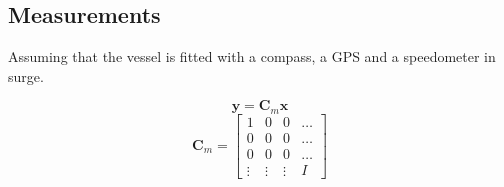 \documentclass[12pt,a4]{article}
\begin{document}
\subsection{Measurements}

Assuming that the vessel is fitted with a compass, a GPS and a speedometer in surge.

\begin{equation}
	\bm{y} = 		\bm{C}_m	\bm{x}
\end{equation}
\begin{equation}
	\bm{C}_m =	\begin{bmatrix} 1 & 0 & 0 & \dots \\ 0 & 0 & 0 & \dots \\ 0 & 0 & 0 & \dots  \\ \vdots & \vdots & \vdots & I \end{bmatrix}
\end{equation}
\end{document}
